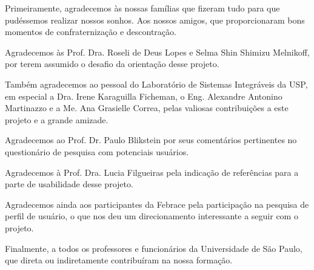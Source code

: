 

Primeiramente, agradecemos às nossas famílias que fizeram tudo para que pudéssemos realizar nossos sonhos. Aos nossos amigos, que proporcionaram bons momentos de confraternização e descontração.

Agradecemos às Prof. Dra. Roseli de Deus Lopes e Selma Shin Shimizu Melnikoff, por terem assumido o desafio da orientação desse projeto.

Também agradecemos ao pessoal do Laboratório de Sistemas Integráveis da USP, em especial a Dra. Irene Karaguilla Ficheman, o Eng. Alexandre Antonino Martinazzo e a Me. Ana Grasielle Correa, pelas valiosas contribuições a este projeto e a grande amizade. 

Agradecemos ao Prof. Dr. Paulo Blikstein por seus comentários pertinentes no questionário de pesquisa com potenciais usuários.

Agradecemos à Prof. Dra. Lucia Filgueiras pela indicação de referências para a parte de usabilidade desse projeto.

Agradecemos ainda aos participantes da Febrace pela participação na pesquisa de perfil de usuário, o que nos deu um direcionamento interessante a seguir com o projeto.

Finalmente, a todos os professores e funcionários da Universidade de São Paulo, que direta ou indiretamente contribuíram na nossa formação.
